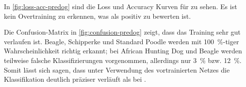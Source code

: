 In \autoref{fig:loss-acc-predog} sind die Loss und Accuracy Kurven für \PreDog{} zu sehen.
Es ist kein Overtraining zu erkennen, was als positiv zu bewerten ist.

Die Confusion-Matrix in \autoref{fig:confusion-predog} zeigt, dass das Training sehr gut
verlaufen ist. Beagle, Schipperke und Standard Poodle werden mit \SI{100}{\percent}-tiger
Wahrscheinlichkeit richtig erkannt; bei African Hunting Dog und Beagle werden teilweise
falsche Klassifizierungen vorgenommen, allerdings nur \SI{3}{\percent} bzw.
\SI{12}{\percent}. Somit lässt sich sagen, dass unter Verwendung des vortrainierten
Netzes die Klassifikation deutlich präziser verläuft als bei \MiniDog{}.


